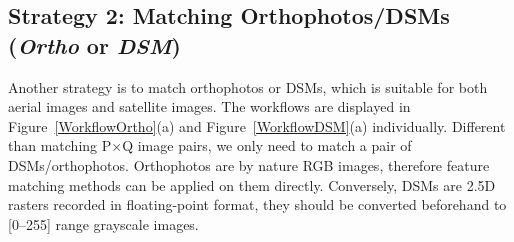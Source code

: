 \subsection{Strategy 2: Matching Orthophotos/DSMs (\textit{Ortho} or \textit{DSM})}
Another strategy is to match orthophotos or DSMs, which is suitable for both aerial images and satellite images. The workflows are displayed in Figure~\ref{WorkflowOrtho}(a) and Figure~\ref{WorkflowDSM}(a) individually. Different than matching P$\times$Q image pairs, we only need to match a pair of DSMs/orthophotos.
Orthophotos are by nature RGB images, therefore feature matching methods can be applied on them directly. Conversely, DSMs are 2.5D rasters recorded in floating-point format, they should be converted beforehand to [0–255] range grayscale images.
\par
